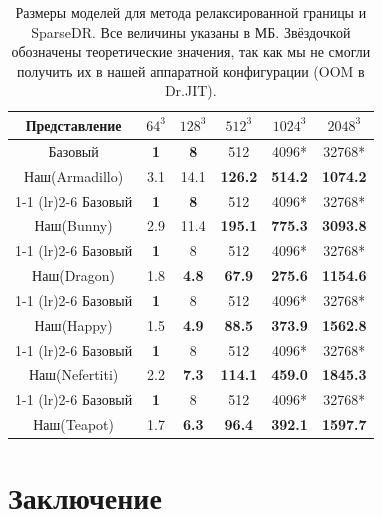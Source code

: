 \documentclass{article}
\begin{document}
\begin{table}
    \centering
    \begin{tabular}{cccccc} %
        \toprule
        Представление & $64^3$ & $128^3$ & $512^3$ & $1024^3$ & $2048^3$  \\
        \midrule[\heavyrulewidth]
        Базовый      & \textbf{1} & \textbf{8} & 512  & 4096* & 32768* \\
        Наш(Armadillo) &   3.1 & 14.1 & \textbf{126.2} & \textbf{514.2} & \textbf{1074.2}  \\
        \cmidrule(lr){1-1}  \cmidrule(lr){2-6}
        Базовый      & \textbf{1} & \textbf{8} & 512  & 4096* & 32768* \\
        Наш(Bunny) &   2.9 & 11.4 & \textbf{195.1} & \textbf{775.3} & \textbf{3093.8}  \\
        \cmidrule(lr){1-1}  \cmidrule(lr){2-6}
        Базовый      & \textbf{1} & 8   & 512  & 4096* & 32768* \\
        Наш(Dragon) &   1.8 & \textbf{4.8} & \textbf{67.9} & \textbf{275.6} & \textbf{1154.6}  \\
        \cmidrule(lr){1-1}  \cmidrule(lr){2-6}
        Базовый      & \textbf{1} & 8   & 512  & 4096* & 32768* \\
        Наш(Happy) &   1.5 & \textbf{4.9} & \textbf{88.5} & \textbf{373.9} & \textbf{1562.8}  \\
        \cmidrule(lr){1-1}  \cmidrule(lr){2-6}
        Базовый      & \textbf{1} & 8   & 512  & 4096* & 32768* \\
        Наш(Nefertiti) &   2.2 & \textbf{7.3} & \textbf{114.1} & \textbf{459.0} & \textbf{1845.3}  \\
        \cmidrule(lr){1-1}  \cmidrule(lr){2-6}
        Базовый      & \textbf{1} & 8   & 512  & 4096* & 32768* \\
        Наш(Teapot) & 1.7 & \textbf{6.3} & \textbf{96.4} & \textbf{392.1} & \textbf{1597.7}  \\
        \bottomrule
    \end{tabular}
    \caption{Размеры моделей для метода релаксированной границы и SparseDR. Все величины указаны в МБ. Звёздочкой обозначены теоретические значения, так как мы не смогли получить их в нашей аппаратной конфигурации (OOM в Dr.JIT).}
    \label{tab:comp_size}
\end{table}

\section{Заключение}
\end{document}
